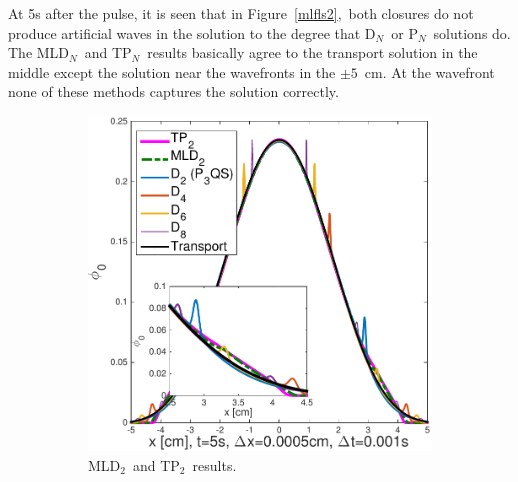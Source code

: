 \documentclass[review]{elsarticle}
\newcommand{\pn}{P$_N$}
\newcommand{\dn}{D$_N$}
\begin{document}
At 5s after the pulse, it is seen that in Figure\ \ref{mlfls2},\ both closures do not produce artificial waves in the solution to the degree that \dn~or \pn~solutions do. The  MLD$_N$\ and TP$_N$\ results basically agree to the transport solution in the middle except the solution near the wavefronts in the $\pm 5$\ cm. At the wavefront none of these methods captures the solution correctly.
\begin{figure}[ht!]
	\begin{subfigure}{.5\textwidth}
		\centering
		\hspace*{-1cm}\includegraphics[width=1.\linewidth]{fl3_comp_5s.pdf}
		\caption{MLD$_2$\ and TP$_2$\ results.}
		\label{f:flml3}
	\end{subfigure}
	~
	\begin{subfigure}{.5\textwidth}
		\centering

\end{subfigure}
\end{figure}
\end{document}
